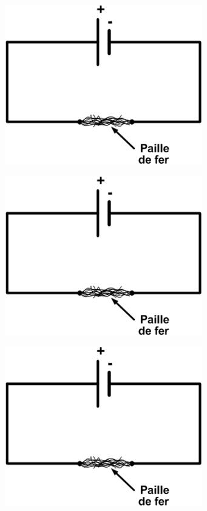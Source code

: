 \documentclass[12pt,a4paper]{article}
\begin{document}
\begin{multicols}{2}



\begin{center}
	\includegraphics[scale=0.45]{img/courtcircuit}
\end{center}

\begin{center}
	\includegraphics[scale=0.45]{img/courtcircuit}
\end{center}

\begin{center}
	\includegraphics[scale=0.45]{img/courtcircuit}
\end{center}


\end{multicols}
\end{document}
